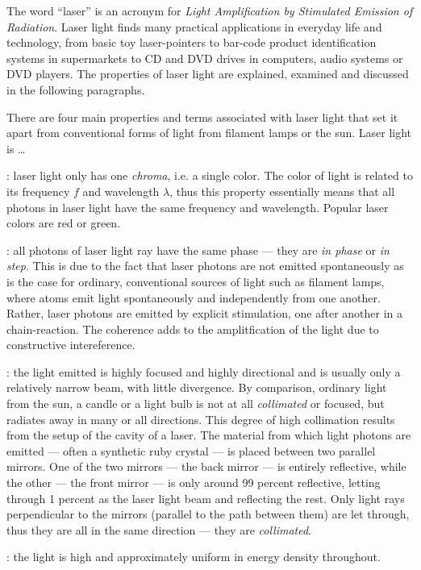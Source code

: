 



\thispagestyle{plain}



The word ``laser'' is an acronym for \emph{Light Amplification by Stimulated Emission of Radiation}. Laser light finds many practical applications in everyday life and technology, from basic toy laser-pointers to bar-code product identification systems in supermarkets to CD and DVD drives in computers, audio systems or DVD players. The properties of laser light are explained, examined and discussed in the following paragraphs.


There are four main properties and terms associated with laser light that set it apart from conventional forms of light from filament lamps or the sun. Laser light is \dots

\begin{itemize}
	
	: laser light only has one \emph{chroma}, i.e. a single color. The color of light is related to its frequency $f$ and wavelength $\lambda$, thus this property essentially means that all photons in laser light have the same frequency and wavelength. Popular laser colors are red or green.

	: all photons of laser light ray have the same phase --- they are \emph{in phase} or \emph{in step}. This is due to the fact that laser photons are not emitted spontaneously as is the case for ordinary, conventional sources of light such as filament lamps, where atoms emit light spontaneously and independently from one another. Rather, laser photons are emitted by explicit stimulation, one after another in a chain-reaction. The coherence adds to the amplitfication of the light due to constructive intereference.

	: the light emitted is highly focused and highly directional and is usually only a relatively narrow beam, with little divergence. By comparison, ordinary light from the sun, a candle or a light bulb is not at all \emph{collimated} or focused, but radiates away in many or all directions. This degree of high collimation results from the setup of the cavity of a laser. The material from which light photons are emitted --- often a synthetic ruby crystal --- is placed between two parallel mirrors. One of the two mirrors --- the back mirror --- is entirely reflective, while the other --- the front mirror --- is only around 99 percent reflective, letting through 1 percent as the laser light beam and reflecting the rest. Only light rays perpendicular to the mirrors (parallel to the path between them) are let through, thus they are all in the same direction --- they are \emph{collimated}.

	: the light is high and approximately uniform in energy density throughout.

\end{itemize}

